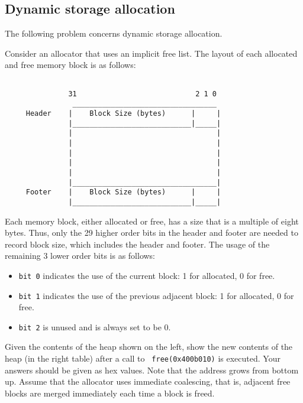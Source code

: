 \subsection*{Dynamic storage allocation}
The following problem concerns dynamic storage allocation.

Consider an allocator that uses an implicit free list.
The layout of each allocated and free memory block is as follows:

\begin{verbatim}

               31                            2 1 0	
                __________________________________
     Header    |    Block Size (bytes)      |     |
               |____________________________|_____|	
               |                                  |
               |                                  |
               |                                  |
               |                                  |
               |                                  |
               |__________________________________|
     Footer    |    Block Size (bytes)      |     |
               |____________________________|_____|

\end{verbatim}

Each memory block, either allocated or free, has a size that is a
multiple of eight bytes. Thus, only the 29 higher order bits in the
header and footer are needed to record block size, which includes the header and footer.  The
usage of the remaining 3 lower order bits is as follows:
\begin{itemize}
\item {\tt bit 0} indicates the use of the current block: 1 for allocated, 0 for free.
\item {\tt bit 1} indicates the use of the previous adjacent block: 1 for allocated, 0 for free.
\item {\tt bit 2} is unused and is always set to be 0.
\end{itemize}
 
\newpage
\begin{problem}{8} 
\end{problem}
Given the contents of the heap shown on the left, show the new
contents of the heap (in the right table) after a call to {\tt
free(0x400b010)} is executed. Your answers should be given as hex
values. Note that the address grows from bottom up. Assume that the
allocator uses immediate coalescing, that is, adjacent free blocks are
merged immediately each time a block is freed.

